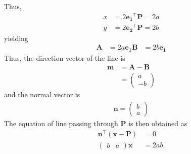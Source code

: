 \documentclass[12pt]{article}
\providecommand{\brak}[1]{\ensuremath{\left(#1\right)}}
\newcommand{\myvec}[1]{\ensuremath{\begin{pmatrix}#1\end{pmatrix}}}
\let\vec\mathbf
\begin{document}
Thus,
\begin{align}
	x&=2\vec{e_{1}}^{\top}\vec{P}=2a\\
	y&=2\vec{e_{2}}^{\top}\vec{P}=2b
\end{align}
yielding
\begin{align}
	\vec{A} &= 2a\vec{e_{1}}
	\vec{B} &= 2b\vec{e_{1}}
\end{align}
Thus, the direction vector of the line is 
\begin{align}
	\vec{m} &= \vec{A}-\vec{B}\\
	&=\myvec{a \\ -b}
\end{align}
and the normal vector is
\begin{align}
	\vec{n} = \myvec{b \\ a}
\end{align}
The equation of line passing through $\vec{P}$ is then obtained as
\begin{align}
	\vec{n}^{\top} \brak{\vec{x}-\vec{P}} &= 0\\
	\myvec{b & a}\vec{x} &= 2ab.
\end{align}
\end{document}
